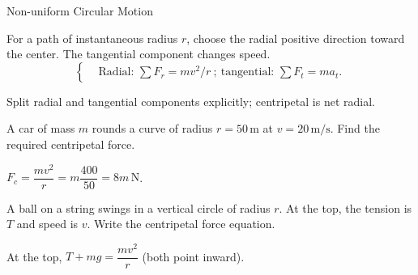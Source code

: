 \begin{KnowledgePoint}{Non-uniform Circular Motion \Core}
  \KPFormulas
  \begin{formulabox}
  For a path of instantaneous radius $r$, choose the radial positive direction toward the center. The tangential component changes speed.
  \[
  \left\{\begin{aligned}
    &\text{Radial: } \sum F_r=m v^2/r\ ;\ \text{tangential: } \sum F_t=m a_t.
  \end{aligned}\right.
  \]
  \end{formulabox}

  \KPHeuristics
  \begin{heuristicsbox}
  Split radial and tangential components explicitly; centripetal is net radial.
  \end{heuristicsbox}

  \KPProblems
\begin{cheatproblem}
  A car of mass $m$ rounds a curve of radius $r=50\,\text{m}$ at $v=20\,\text{m/s}$. Find the required centripetal force.
\begin{solutionbox}
  $F_c=\dfrac{mv^2}{r}=m\dfrac{400}{50}=8m\,\text{N}$.
\end{solutionbox}
\end{cheatproblem}
\begin{cheatproblem}
  A ball on a string swings in a vertical circle of radius $r$. At the top, the tension is $T$ and speed is $v$. Write the centripetal force equation.
\begin{solutionbox}
  At the top, $T+mg=\dfrac{mv^2}{r}$ (both point inward).
\end{solutionbox}
\end{cheatproblem}
\end{KnowledgePoint}

